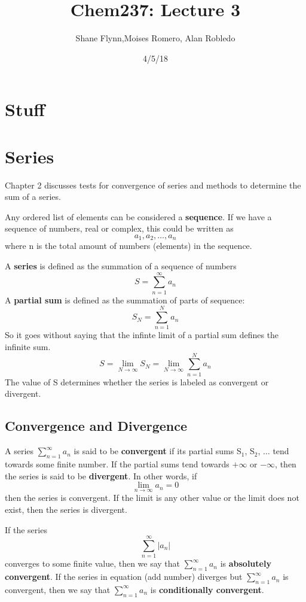 \documentclass{article}
\title{Chem237: Lecture 3}
\date{4/5/18}
\author{Shane Flynn,Moises Romero, Alan Robledo}
\newcommand{\be}{\begin{equation}}
\newcommand{\ee}{\end{equation}}
\begin{document}
\maketitle
\section*{Stuff}
\section*{Series}
Chapter 2 discusses tests for convergence of series and methods to determine the sum of a series.

Any ordered list of elements can be considered a \textbf{sequence}.
If we have a sequence of numbers, real or complex, this could be written as
\be
  a_1, a_2, \hdots, a_n
\ee
where n is the total amount of numbers (elements) in the sequence.

A \textbf{series} is defined as the summation of a sequence of numbers
\be
S=\sum_{n=1}^{\infty} a_n
\ee
A \textbf{partial sum} is defined as the summation of parts of sequence:
\be
S_N = \sum_{n=1}^{N} a_n
\ee
So it goes without saying that the infinte limit of a partial sum defines the infinite sum.
\be
S = \lim_{N \to \infty}{S_N} = \lim_{N \to \infty} \sum_{n=1}^{N} a_n
\ee
The value of S determines whether the series is labeled as convergent or divergent.
\subsection*{Convergence and Divergence}
A series $\sum\limits_{n=1}^{\infty} a_n$ is said to be \textbf{convergent} if its partial sums S$_1$, S$_2$, $\hdots$ tend towards some finite number.
If the partial sums tend towards $+\infty$ or $-\infty$, then the series is said to be \textbf{divergent}.
In other words, if
\be
\lim_{n \to \infty}{a_n} = 0
\ee
then the series is convergent.
If the limit is any other value or the limit does not exist, then the series is divergent.

If the series
\be
\sum_{n=1}^{\infty} |a_n|
\ee
converges to some finite value, then we say that $\sum\limits_{n=1}^{\infty} a_n$ is \textbf{absolutely convergent}.
If the series in equation (add number) diverges but $\sum\limits_{n=1}^{\infty} a_n$ is convergent, then we say that $\sum\limits_{n=1}^{\infty} a_n$ is \textbf{conditionally convergent}.
\end{document}

